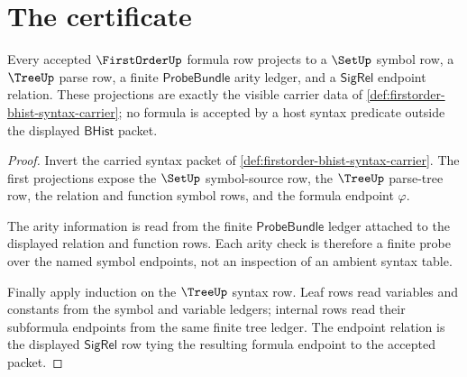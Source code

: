 \section{The certificate}
\label{sec:firstorder-certificate}

\begin{theorem}\label{thm:firstorder-formula-carrier-obligation}
Every accepted $\FirstOrderUp$ formula row projects to a $\SetUp$ symbol row,
a $\TreeUp$ parse row, a finite $\mathsf{ProbeBundle}$ arity ledger, and a $\mathsf{SigRel}$
endpoint relation. These projections are exactly the visible carrier data of
\autoref{def:firstorder-bhist-syntax-carrier}; no formula is accepted by a
host syntax predicate outside the displayed $\mathsf{BHist}$ packet.
\end{theorem}
\begin{proof}
Invert the carried syntax packet of
\autoref{def:firstorder-bhist-syntax-carrier}. The first projections expose
the $\SetUp$ symbol-source row, the $\TreeUp$ parse-tree row, the relation and
function symbol rows, and the formula endpoint $\varphi$.

The arity information is read from the finite $\mathsf{ProbeBundle}$ ledger attached
to the displayed relation and function rows. Each arity check is therefore a
finite probe over the named symbol endpoints, not an inspection of an ambient
syntax table.

Finally apply induction on the $\TreeUp$ syntax row. Leaf rows read variables
and constants from the symbol and variable ledgers; internal rows read their
subformula endpoints from the same finite tree ledger. The endpoint relation
is the displayed $\mathsf{SigRel}$ row tying the resulting formula endpoint to the
accepted packet.
\end{proof}

